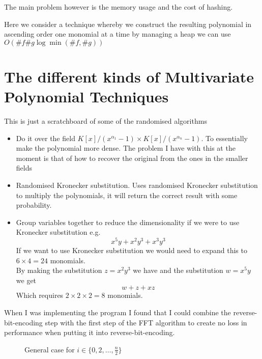 The main problem however is the memory usage and the cost of hashing.

Here we consider a technique whereby we construct the resulting polynomial in ascending order one monomial at a time by managing a heap we can use $O(\#f \#g \log \min(\# f, \# g))$


\section{The different kinds of Multivariate Polynomial Techniques}

This is just a scratchboard of some of the randomised algorithms

\begin{itemize}
    \item Do it over the field $K[x]/(x^{\alpha_1} -1) \times K[x]/(x^{\alpha_n} -1)$. To essentially make the polynomial more dense. The problem I have with this at the moment is that of how to recover the original from the ones in the smaller fields
    \item Randomised Kronecker substitution. Uses randomised Kronecker substitution to multiply the polynomials, it will return the correct result with some probability.
    \item Group variables together to reduce the dimensionality if we were to use Kronecker substitution e.g.
        \[
        x^5y + x^2y^3 + x^3y^3
    \]
    If we want to use Kronecker substitution we would need to expand this to $6 \times 4 = 24$ monomials.\\
    By making the substitution $z = x^2y^3$ we have and the substitution $w = x^5y$ we get
    \[
        w + z + xz
    \]
    Which requires $2 \times 2 \times 2 = 8$ monomials.

\end{itemize}

When I was implementing the program I found that I could combine the reverse-bit-encoding step with the first step of the FFT algorithm to create no loss in performance when putting it into reverse-bit-encoding.
\begin{figure}
    \centering
    \caption{General case for $i \in \{0, 2, \ldots, \frac{n}{2}\}$}
\end{figure}

